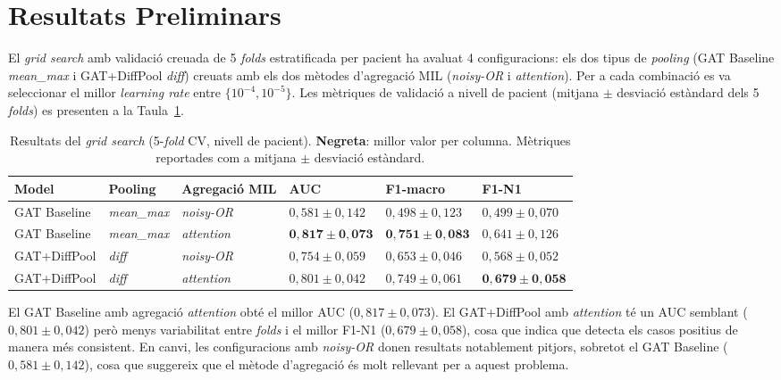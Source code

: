 \documentclass[10pt,a4paper,twocolumn,twoside]{article}
\begin{document}
\section{Resultats Preliminars}

El \textit{grid search} amb validació creuada de 5 \textit{folds} estratificada per pacient ha avaluat 4 configuracions:
els dos tipus de \textit{pooling} (GAT Baseline \textit{mean\_max} i GAT+DiffPool \textit{diff}) creuats amb els
dos mètodes d'agregació MIL (\textit{noisy-OR} i \textit{attention}). Per a cada combinació es va seleccionar
el millor \textit{learning rate} entre $\{10^{-4}, 10^{-5}\}$. Les mètriques de validació a nivell de pacient
(mitjana $\pm$ desviació estàndard dels 5 \textit{folds}) es presenten a la Taula~\ref{tab:grid}.

\begin{table}[t]
\centering
\caption{Resultats del \textit{grid search} (5-\textit{fold} CV, nivell de pacient).
\textbf{Negreta}: millor valor per columna.
Mètriques reportades com a mitjana $\pm$ desviació estàndard.}
\label{tab:grid}
\small
\begin{tabular}{llllll}
\toprule
\textbf{Model} & \textbf{Pooling} & \textbf{Agregació MIL} & \textbf{AUC} & \textbf{F1-macro} & \textbf{F1-N1} \\
\midrule
GAT Baseline & \textit{mean\_max} & \textit{noisy-OR}  & $0{,}581 \pm 0{,}142$ & $0{,}498 \pm 0{,}123$ & $0{,}499 \pm 0{,}070$ \\
GAT Baseline & \textit{mean\_max} & \textit{attention} & $\mathbf{0{,}817 \pm 0{,}073}$ & $\mathbf{0{,}751 \pm 0{,}083}$ & $0{,}641 \pm 0{,}126$ \\
GAT+DiffPool & \textit{diff}      & \textit{noisy-OR}  & $0{,}754 \pm 0{,}059$ & $0{,}653 \pm 0{,}046$ & $0{,}568 \pm 0{,}052$ \\
GAT+DiffPool & \textit{diff}      & \textit{attention} & $0{,}801 \pm 0{,}042$ & $0{,}749 \pm 0{,}061$ & $\mathbf{0{,}679 \pm 0{,}058}$ \\
\bottomrule
\end{tabular}
\end{table}

El GAT Baseline amb agregació \textit{attention} obté el millor AUC ($0{,}817 \pm 0{,}073$).
El GAT+DiffPool amb \textit{attention} té un AUC semblant ($0{,}801 \pm 0{,}042$) però
menys variabilitat entre \textit{folds} i el millor F1-N1 ($0{,}679 \pm 0{,}058$), cosa que
indica que detecta els casos positius de manera més consistent. En canvi, les configuracions
amb \textit{noisy-OR} donen resultats notablement pitjors, sobretot el GAT Baseline
($0{,}581 \pm 0{,}142$), cosa que suggereix que el mètode d'agregació és molt rellevant
per a aquest problema.
\end{document}
